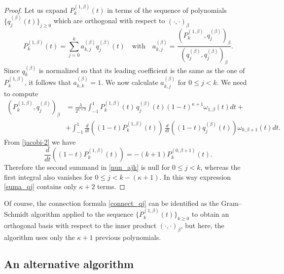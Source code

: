 \documentclass{amsart}
\theoremstyle{plain}%
\theoremstyle{definition}
\theoremstyle{remark}
\begin{document}
\begin{proof}
Let us expand $P_k^{(1,\beta)}(t)$ in terms of the sequence of polynomials
\(\{q_j^{(\beta)}(t)\}_{j\geqslant 0}\)
which are orthogonal with respect to \((\cdot,\cdot)_{\beta}\)
\begin{equation} \label{suma_qj}
P_{k}^{(1, \beta)}(t) = \sum_{j=0}^k  a^{(\beta)}_{k,j} q_j^{(\beta)}(t) \quad \text{with}\quad
    a^{(\beta)}_{k,j} = \frac{(P_{k}^{(1, \beta)}, q_j^{(\beta)})_{\beta} } { (q_{j}^{(\beta)},q_{j}^{(\beta)})_{\beta} }.
\end{equation}
Since $q_k^{(\beta)}$ is normalized so that its leading coefficient is the same as the one of $P_k^{(1,{\beta})}$, it follows that  $a^{(\beta)}_{k,k} = 1.$
We now {calculate} $a^{(\beta)}_{k,j}$ for $0 \le j < k$. We need to compute
\begin{align}
(P_{k}^{(1, \beta)}, q_j^{(\beta)})_{\beta} &= \frac{\lambda}{2^{\kappa+3}} \int_{-1}^1
P_{k}^{(1, \beta)}(t)\, q_j^{(\beta)}(t)(1-t)^{\kappa+1} \omega_{1,\beta}(t) dt + \nonumber\\
& + \int_{-1}^1 \frac{d}{dt}\left((1-t)P_{k}^{(1, \beta)}(t)\right)\, \frac{d}{dt}\left((1-t)q_j^{(\beta)}(t)\right) \omega_{0,\beta+1}(t) dt. \label{nun_ajk}
\end{align}
From \eqref{jacobi-2} we have
\begin{equation} \label{d_Pk}
\frac{d}{dt}\left((1-t)P_{k}^{(1, \beta)}(t)\right) = - (k+1)P_{k}^{(0, \beta+1)}(t). 
\end{equation}
Therefore the second summand in \eqref{nun_ajk} is null for \(0\leqslant j <k\), whereas the first integral also vanishes for \(0\leqslant j <k-(\kappa+1)\). In this way expression \eqref{suma_qj} contains only \(\kappa+2\) terms.
\end{proof}

Of course, the connection formula \eqref{connect_qj} can be identified as the Gram--Schmidt algorithm applied to the sequence \(\{P_{k}^{(1, \beta)}(t)\}_{k\geqslant 0}\) to obtain an orthogonal basis with respect to the inner product \((\cdot, \cdot)_{\beta}\), but here, the algorithm uses only the \(\kappa+1\) previous polynomials.

\subsection{An alternative algorithm}
\end{document}
